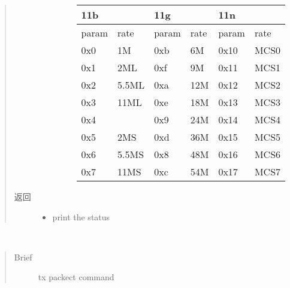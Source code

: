 \documentclass[letterpaper,10pt,english]{sphinxhowto}
\begin{document}
\begin{fulllineitems}
\begin{fulllineitems}
\begin{quote}
\begin{description}
\begin{itemize}
\begin{description}
\begin{savenotes}\sphinxattablestart
\centering
\begin{tabulary}{\linewidth}[t]{|T|T|T|T|T|T|}
\hline
\sphinxstyletheadfamily 
11b
&\sphinxstyletheadfamily &\sphinxstyletheadfamily 
11g
&\sphinxstyletheadfamily &\sphinxstyletheadfamily 
11n
&\sphinxstyletheadfamily \\
\hline\sphinxstyletheadfamily 
param
&\sphinxstyletheadfamily 
rate
&\sphinxstyletheadfamily 
param
&\sphinxstyletheadfamily 
rate
&\sphinxstyletheadfamily 
param
&\sphinxstyletheadfamily 
rate
\\
\hline
0x0
&
1M
&
0xb
&
6M
&
0x10
&
MCS0
\\
\hline
0x1
&
2ML
&
0xf
&
9M
&
0x11
&
MCS1
\\
\hline
0x2
&
5.5ML
&
0xa
&
12M
&
0x12
&
MCS2
\\
\hline
0x3
&
11ML
&
0xe
&
18M
&
0x13
&
MCS3
\\
\hline
0x4
&
\textendash{}
&
0x9
&
24M
&
0x14
&
MCS4
\\
\hline
0x5
&
2MS
&
0xd
&
36M
&
0x15
&
MCS5
\\
\hline
0x6
&
5.5MS
&
0x8
&
48M
&
0x16
&
MCS6
\\
\hline
0x7
&
11MS
&
0xc
&
54M
&
0x17
&
MCS7
\\
\hline
\end{tabulary}
\par
\sphinxattableend\end{savenotes}

\end{description}

\end{itemize}

\item[{返回}] \leavevmode
\begin{itemize}
\item {} 
print the status

\end{itemize}


\end{description}\end{quote}

\end{fulllineitems}


\begin{fulllineitems}
\label{\detokenize{rfapi/index:wifi_api.WIFIAPI.esp_tx}}~\begin{quote}\begin{description}
\item[{Brief}] \leavevmode
tx packect command


\end{description}
\end{quote}
\end{fulllineitems}
\end{fulllineitems}
\end{document}
